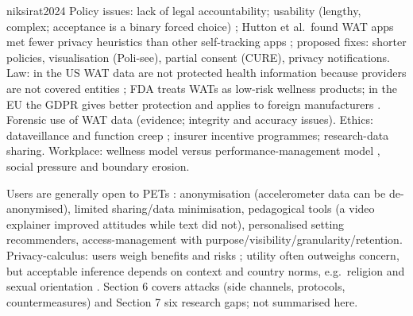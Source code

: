 \begin{papercard}{niksirat2024}
 Policy issues: lack of legal accountability; usability (lengthy, complex; acceptance is a binary forced choice) ; Hutton et al.\ found WAT apps met fewer privacy heuristics than other self-tracking apps ; proposed fixes: shorter policies, visualisation (Poli-see), partial consent (CURE), privacy notifications. Law: in the US WAT data are not protected health information because providers are not covered entities ; FDA treats WATs as low-risk wellness products; in the EU the GDPR gives better protection and applies to foreign manufacturers . Forensic use of WAT data (evidence; integrity and accuracy issues). Ethics: dataveillance and function creep ; insurer incentive programmes; research-data sharing. Workplace: wellness model versus performance-management model , social pressure and boundary erosion.

 Users are generally open to PETs : anonymisation (accelerometer data can be de-anonymised), limited sharing/data minimisation, pedagogical tools (a video explainer improved attitudes while text did not), personalised setting recommenders, access-management with purpose/visibility/granularity/retention. Privacy-calculus: users weigh benefits and risks ; utility often outweighs concern, but acceptable inference depends on context and country norms, e.g.\ religion and sexual orientation . Section 6 covers attacks (side channels, protocols, countermeasures) and Section 7 six research gaps; not summarised here.


\end{papercard}
